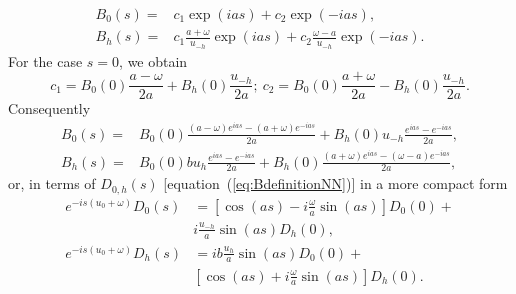 \documentclass[preprint]{iucr}              %
\newcommand{\inred}[1]{{\color{red}#1}}
\begin{document}
\begin{subequations}
\label{eq:BSolutions}
\begin{align}
B_0(s) = &c_1 \exp(i a s) + c_2 \exp(-i a s), \\
B_h(s) = &c_1 \frac{a+\omega}{u_{-h}} \exp(i a s) + c_2 
\frac{\omega-a}{u_{-h}} \exp(-i a s).
\end{align}
\end{subequations}
For the case $s=0$, we obtain
\begin{equation}
\label{eq:cs}
c_1=B_0(0) \frac{a-\omega}{2a}
+ B_h(0) \frac{u_{-h}}{2a};~ 
c_2=B_0(0)
\frac{a+\omega}{2a} - 
B_h(0) \frac{u_{-h}}{2a}. \nonumber
\end{equation}
Consequently
\begin{subequations}
\label{eq:preBSolutions}
\begin{align}
B_0(s) = &B_0(0) \frac{(a-\omega)e^{ias}-(a+\omega) e^{-ias}}{2a} +
B_h(0) u_{-h} \frac{e^{ias} - e^{-ias}}{2a}, \nonumber\\
B_h(s) = &B_0(0) b u_h 
\frac{e^{ias}-e^{-ias}}{2a}
+ B_h(0) 
\frac{(a+\omega) e^{ias}- (\omega-a) e^{-ias}}{2a}
, \nonumber
\end{align}
\end{subequations}
or, in terms of $D_{0,h}(s)$ [equation~(\ref{eq:BdefinitionNN})] in a more compact form
\begin{subequations}
\label{eq:DSolutionsCompact}
\begin{align}
e^{-is(u_0+\omega)} D_0(s) &=  [\cos(as) - i\frac{\omega}{a}\sin(as)] D_0(0) +  \nonumber \\
&i \frac{u_{-h}}{a}\sin(as) D_h(0), \\
e^{-is(u_0+\omega)} D_h(s) &= i b \frac{u_h}{a} \sin(as) D_0(0) + \nonumber \\ 
    &[\cos(as) + i \frac{\omega}{a} \sin(as)] D_h(0).
\end{align}
\end{subequations}

\end{document}
